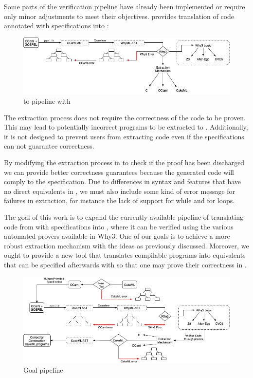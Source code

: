 Some parts of the verification pipeline have already been implemented or require only minor adjustments to meet their 
objectives. \cameleer provides translation of \ocaml code annotated with \gospel specifications into \whyml :

\begin{figure}[H]
    \centering
    \includegraphics[width=\linewidth]{images/Cameleer.png}
    \caption{\ocaml to \whyml pipeline with \cameleer}
    \label{fig:Cameleer_pipeline}
\end{figure}

The extraction process does not require the correctness of the code to be proven. This may lead to potentially incorrect \ocaml 
programs to be extracted to \cml. Additionally, it is not designed to prevent users from extracting code even if the \gospel 
specifications can not guarantee correctness.


By modifying the extraction process in \whythree to check if the proof has been discharged we can provide better correctness 
guarantees because the generated \cml code will comply to the specification. Due to differences in syntax and features that 
have no direct equivalents in \cml, we must also include some kind of error message for failures in extraction, for instance 
the lack of support for while and for loops.

The goal of this work is to expand the currently available pipeline of translating code from \ocaml with \gospel specifications 
into \whyml, where it can be verified using the various automated provers available in Why3. One of our goals is to achieve 
a more robust extraction mechanism with the ideas as previously discussed. Moreover, we ought to provide a new tool that 
translates compilable \cml programs into \ocaml equivalents that can be specified afterwards with \gospel so that one may prove 
their correctness in \cameleer.

\begin{figure}[H]
    \centering
    \includegraphics[width=\linewidth]{images/Goal_Pipeline.png}
    \caption{Goal pipeline}
\end{figure}



